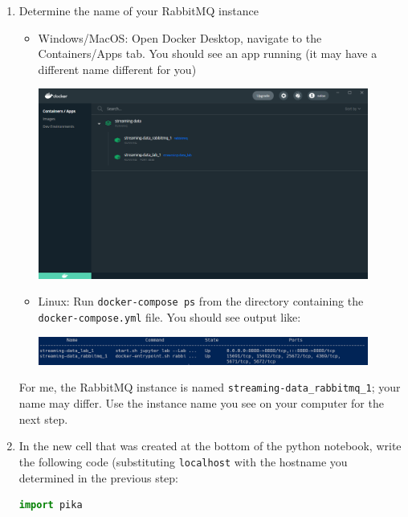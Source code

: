 \documentclass[letterpaper,10pt]{article}
\begin{document}
\begin{enumerate}
\begin{center}
		\end{center}
	\item Determine the name of your RabbitMQ instance
		\begin{itemize}
			\item Windows/MacOS: Open Docker Desktop, navigate to the Containers/Apps tab.  You should see an app running (it may have a different name different for you)
				\begin{center}
					\includegraphics[width=0.9\textwidth]{docker-desktop.PNG}
				\end{center}
			\item Linux: Run \texttt{docker-compose ps} from the directory containing the \texttt{docker-compose.yml} file.  You should see output like:
				\begin{center}
					\includegraphics[width=0.9\textwidth]{docker-compose-ps.PNG}
				\end{center}
		\end{itemize}
		For me, the RabbitMQ instance is named \texttt{streaming-data\_rabbitmq\_1}; your name may differ.  Use the instance name you see on your computer for the next step.
	\item In the new cell that was created at the bottom of the python notebook, write the following code (substituting \texttt{localhost} with the hostname you determined in the previous step:
		\begin{lstlisting}[language=Python]
import pika


\end{lstlisting}
\end{enumerate}
\end{document}
